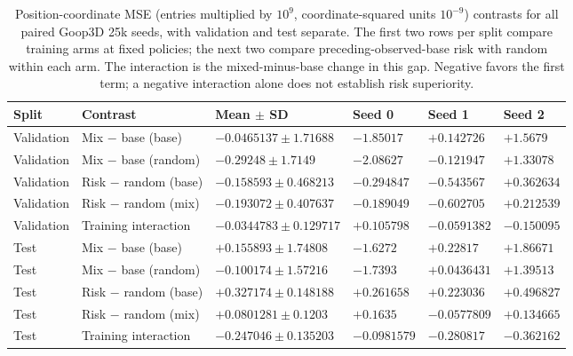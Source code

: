 \begin{table}[p]
\centering\scriptsize
\caption{Position-coordinate MSE (entries multiplied by $10^9$, coordinate-squared units $10^{-9}$) contrasts for all paired Goop3D 25k seeds, with validation and test separate. The first two rows per split compare training arms at fixed policies; the next two compare preceding-observed-base risk with random within each arm. The interaction is the mixed-minus-base change in this gap. Negative favors the first term; a negative interaction alone does not establish risk superiority.}
\label{tab:goop3d25k-observed-position-contrasts}
\setlength{\tabcolsep}{3pt}
\begin{tabular}{llllll}
\toprule
Split & Contrast & Mean $\pm$ SD & Seed 0 & Seed 1 & Seed 2\\
\midrule
Validation & Mix $-$ base (base) & $-0.0465137\pm1.71688$ & $-1.85017$ & $+0.142726$ & $+1.5679$\\
Validation & Mix $-$ base (random) & $-0.29248\pm1.7149$ & $-2.08627$ & $-0.121947$ & $+1.33078$\\
Validation & Risk $-$ random (base) & $-0.158593\pm0.468213$ & $-0.294847$ & $-0.543567$ & $+0.362634$\\
Validation & Risk $-$ random (mix) & $-0.193072\pm0.407637$ & $-0.189049$ & $-0.602705$ & $+0.212539$\\
Validation & Training interaction & $-0.0344783\pm0.129717$ & $+0.105798$ & $-0.0591382$ & $-0.150095$\\
Test & Mix $-$ base (base) & $+0.155893\pm1.74808$ & $-1.6272$ & $+0.22817$ & $+1.86671$\\
Test & Mix $-$ base (random) & $-0.100174\pm1.57216$ & $-1.7393$ & $+0.0436431$ & $+1.39513$\\
Test & Risk $-$ random (base) & $+0.327174\pm0.148188$ & $+0.261658$ & $+0.223036$ & $+0.496827$\\
Test & Risk $-$ random (mix) & $+0.0801281\pm0.1203$ & $+0.1635$ & $-0.0577809$ & $+0.134665$\\
Test & Training interaction & $-0.247046\pm0.135203$ & $-0.0981579$ & $-0.280817$ & $-0.362162$\\
\bottomrule
\end{tabular}
\end{table}

